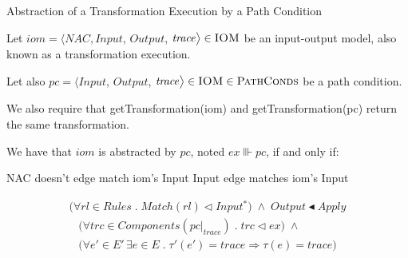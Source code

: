 \begin{definition}{Abstraction of a Transformation Execution by a Path Condition\\}
\label{def:abstraction_pc_ex}

Let $iom = \big\langle \mathit{NAC}, \mathit{Input}$, $\mathit{Output}$, $\mathit{trace}\big\rangle \in \textsc{IOM}$ be an input-output model, also known as a transformation execution. 

Let also $pc = \big\langle \mathit{Input}$, $\mathit{Output}$, $\mathit{trace}\big\rangle \in \textsc{IOM}  \in
\textsc{PathConds}$ be a path condition.

We also require that getTransformation(iom) and getTransformation(pc) return the same transformation.

We have that $iom$ is abstracted by $pc$, noted $ex\Vvdash pc$, if and only if:

NAC doesn't edge match iom's Input
Input edge matches iom's Input





\begin{multline}
\label{eq:abstr_input_output}
\big(\forall rl\in Rules\;.\;Match(rl) \vartriangleleft Input^*\big) \;\land\; Output \blacktriangleleft Apply
\end{multline}
\begin{multline}
\label{eq:abstr_trace}
\big(\forall trc\in Components(pc|_{trace})\;.\;trc\vartriangleleft ex\big)\;\land\;\\
\big(\forall e'\in E'\, \exists e\in E\;.\;\tau'(e')=trace \Longrightarrow \tau(e)=trace\big)
\end{multline} 

  

  
  
\end{definition} 


